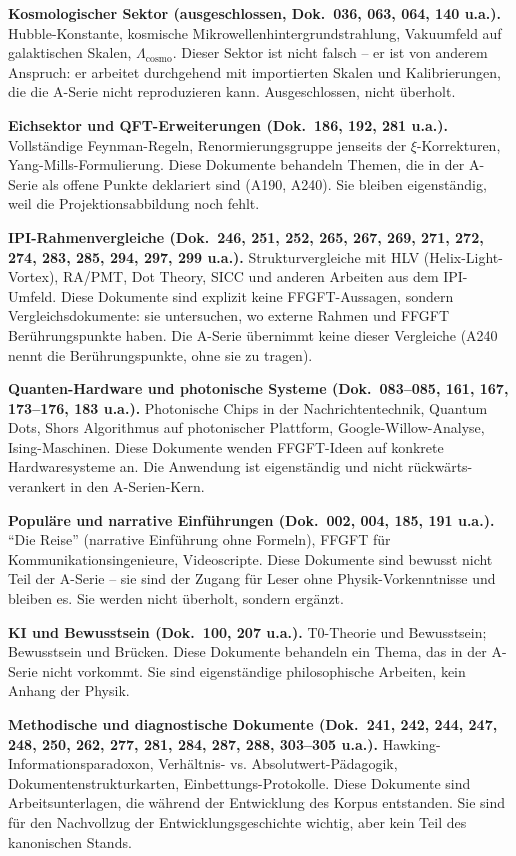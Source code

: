 \textbf{Kosmologischer Sektor (ausgeschlossen, Dok.~036, 063, 064, 140 u.a.).}
Hubble-Konstante, kosmische Mikrowellenhintergrundstrahlung, Vakuumfeld auf
galaktischen Skalen, $\Lambda_\text{cosmo}$. Dieser Sektor ist nicht falsch --
er ist von anderem Anspruch: er arbeitet durchgehend mit importierten Skalen und
Kalibrierungen, die die A-Serie nicht reproduzieren kann. Ausgeschlossen, nicht
überholt.

\textbf{Eichsektor und QFT-Erweiterungen (Dok.~186, 192, 281 u.a.).}
Vollständige Feynman-Regeln, Renormierungsgruppe jenseits der $\xi$-Korrekturen,
Yang-Mills-Formulierung. Diese Dokumente behandeln Themen, die in der A-Serie als
offene Punkte deklariert sind (A190, A240). Sie bleiben eigenständig, weil die
Projektionsabbildung noch fehlt.

\textbf{IPI-Rahmenvergleiche (Dok.~246, 251, 252, 265, 267, 269, 271, 272,
274, 283, 285, 294, 297, 299 u.a.).} Strukturvergleiche mit HLV (Helix-Light-Vortex),
RA/PMT, Dot Theory, SICC und anderen Arbeiten aus dem IPI-Umfeld. Diese Dokumente
sind explizit keine FFGFT-Aussagen, sondern Vergleichsdokumente: sie untersuchen,
wo externe Rahmen und FFGFT Berührungspunkte haben. Die A-Serie übernimmt keine
dieser Vergleiche (A240 nennt die Berührungspunkte, ohne sie zu tragen).

\textbf{Quanten-Hardware und photonische Systeme (Dok.~083--085, 161, 167,
173--176, 183 u.a.).} Photonische Chips in der Nachrichtentechnik, Quantum Dots,
Shors Algorithmus auf photonischer Plattform, Google-Willow-Analyse, Ising-Maschinen.
Diese Dokumente wenden FFGFT-Ideen auf konkrete Hardwaresysteme an. Die Anwendung
ist eigenständig und nicht rückwärts-verankert in den A-Serien-Kern.

\textbf{Populäre und narrative Einführungen (Dok.~002, 004, 185, 191 u.a.).}
\enquote{Die Reise} (narrative Einführung ohne Formeln), FFGFT für Kommunikationsingenieure,
Videoscripte. Diese Dokumente sind bewusst nicht Teil der A-Serie -- sie sind
der Zugang für Leser ohne Physik-Vorkenntnisse und bleiben es. Sie werden nicht
überholt, sondern ergänzt.

\textbf{KI und Bewusstsein (Dok.~100, 207 u.a.).} T0-Theorie und Bewusstsein;
Bewusstsein und Brücken. Diese Dokumente behandeln ein Thema, das in der A-Serie
nicht vorkommt. Sie sind eigenständige philosophische Arbeiten, kein Anhang der Physik.

\textbf{Methodische und diagnostische Dokumente (Dok.~241, 242, 244, 247, 248,
250, 262, 277, 281, 284, 287, 288, 303--305 u.a.).} Hawking-Informationsparadoxon,
Verhältnis- vs. Absolutwert-Pädagogik, Dokumentenstrukturkarten, Einbettungs-Protokolle.
Diese Dokumente sind Arbeitsunterlagen, die während der Entwicklung des Korpus
entstanden. Sie sind für den Nachvollzug der Entwicklungsgeschichte wichtig,
aber kein Teil des kanonischen Stands.

